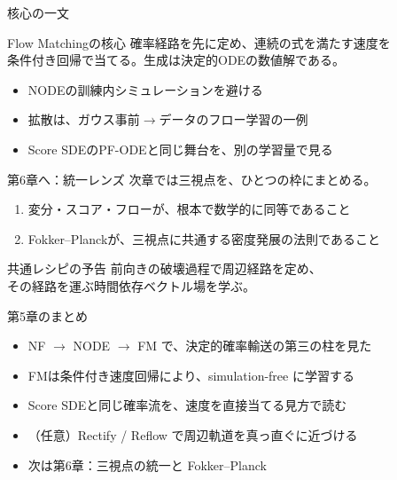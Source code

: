 \asmain
\begin{frame}{核心の一文}
    \begin{block}{Flow Matchingの核心}
        確率経路を先に定め、連続の式を満たす速度を\\
        条件付き回帰で当てる。生成は決定的ODEの数値解である。
    \end{block}
    \begin{itemize}
        \item NODEの訓練内シミュレーションを避ける
        \item 拡散は、ガウス事前$\to$データのフロー学習の一例
        \item Score SDEのPF-ODEと同じ舞台を、別の学習量で見る
    \end{itemize}
\end{frame}
\asmain
\begin{frame}{第6章へ：統一レンズ}
    次章では三視点を、ひとつの枠にまとめる。
    \begin{enumerate}
        \item 変分・スコア・フローが、根本で数学的に同等であること
        \item Fokker--Planckが、三視点に共通する密度発展の法則であること
    \end{enumerate}
    \begin{block}{共通レシピの予告}
        前向きの破壊過程で周辺経路を定め、\\
        その経路を運ぶ時間依存ベクトル場を学ぶ。
    \end{block}
\end{frame}
\asmain
\begin{frame}{第5章のまとめ}
    \begin{itemize}
        \item NF $\to$ NODE $\to$ FM で、決定的確率輸送の第三の柱を見た
        \item FMは条件付き速度回帰により、simulation-free に学習する
        \item Score SDEと同じ確率流を、速度を直接当てる見方で読む
        \item （任意）Rectify / Reflow で周辺軌道を真っ直ぐに近づける
        \item 次は第6章：三視点の統一と Fokker--Planck
    \end{itemize}
\end{frame}
